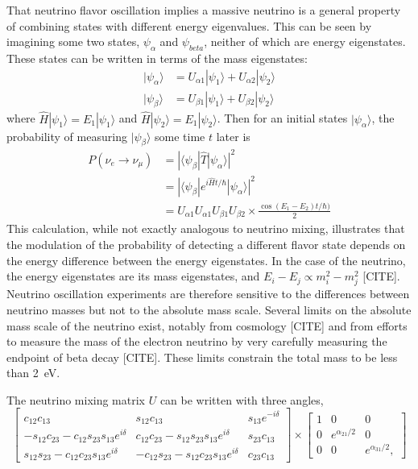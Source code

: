 That neutrino flavor oscillation implies a massive neutrino is a general property of combining states with different energy eigenvalues.  This can be seen by imagining some two states, $\psi_{\alpha}$ and $\psi_{beta}$, neither of which are energy eigenstates.  These states can be written in terms of the mass eigenstates: 
\begin{align}
|\psi_{\alpha}\rangle &= U_{\alpha 1}|\psi_1\rangle + U_{\alpha 2}|\psi_2\rangle \\
|\psi_{\beta}\rangle &= U_{{\beta}1}|\psi_1\rangle + U_{{\beta}2}|\psi_2\rangle 
\end{align}
where $\hat{H}|\psi_1\rangle = E_1|\psi_1\rangle$ and $\hat{H}|\psi_2\rangle = E_1|\psi_2\rangle$.  Then for an initial states $|\psi_{\alpha}\rangle$, the probability of measuring $|\psi_{\beta}\rangle$ some time $t$ later is
\begin{align}
P(\nu_e\rightarrow\nu_{\mu}) &=  |\langle\psi_{\beta}|\hat{T}|\psi_{\alpha}\rangle|^2 \\
                             &=  |\langle\psi_{\beta}|e^{i\hat{H}t / \hbar}|\psi_{\alpha}\rangle|^2 \\
                             &=  U_{{\alpha}1}U_{{\alpha}1}U_{{\beta}1}U_{{\beta}2} \times \frac{\cos(E_1 - E_2)t/\hbar)}{2} 
\end{align}
This calculation, while not exactly analogous to neutrino mixing, illustrates that the modulation of the probability of detecting a different flavor state depends on the energy difference between the energy eigenstates.  In the case of the neutrino, the energy eigenstates are its mass eigenstates, and $E_i - E_j \propto m_i^2 - m_j^2$ [CITE].  Neutrino oscillation experiments are therefore sensitive to the differences between neutrino masses but not to the absolute mass scale.  Several limits on the absolute mass scale of the neutrino exist, notably from cosmology [CITE] and from efforts to measure the mass of the electron neutrino by very carefully measuring the endpoint of beta decay [CITE].  These limits constrain the total mass to be less than 2~eV.  

The neutrino mixing matrix $U$ can be written with three angles,
\begin{equation}
\begin{bmatrix}
c_{12}c_{13} & s_{12}c_{13} & s_{13}e^{-i\delta} \\
-s_{12}c_{23}-c_{12}s_{23}s_{13}e^{i\delta} & c_{12}c_{23}-s_{12}s_{23}s_{13}e^{i\delta} & s_{23}c_{13} \\
s_{12}s_{23}-c_{12}c_{23}s_{13}e^{i\delta} & -c_{12}s_{23}-s_{12}c_{23}s_{13}e^{i\delta} & c_{23}c_{13} 
\end{bmatrix}
\times
\begin{bmatrix}
1 & 0 & 0 \\
0 & e^{\alpha_{21} / 2} & 0 \\
0 & 0 & e^{\alpha_{31} / 2},
\end{bmatrix}
\end{equation}

